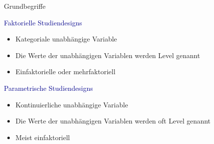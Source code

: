 \documentclass[
  8pt,
  ignorenonframetext,
]{beamer}
\providecommand{\tightlist}{%
  \setlength{\itemsep}{0pt}\setlength{\parskip}{0pt}}
\begin{document}
\begin{frame}{Grundbegriffe}
\protect\hypertarget{grundbegriffe-5}{}

\textcolor{darkblue}{Faktorielle Studiendesigns}

\begin{itemize}
\tightlist
\item
  Kategoriale unabhängige Variable
\item
  Die Werte der unabhängigen Variablen werden Level genannt
\item
  Einfaktorielle oder mehrfaktoriell
\end{itemize}

\textcolor{darkblue}{Parametrische Studiendesigns}

\begin{itemize}
\tightlist
\item
  Kontinuierliche unabhängige Variable
\item
  Die Werte der unabhängigen Variablen werden oft Level genannt
\item
  Meist einfaktoriell
\end{itemize}
\end{frame}
\end{document}
